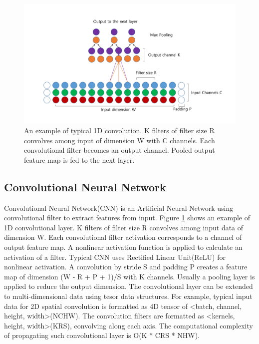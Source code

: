 \begin{figure}
  \centering
  \includegraphics[width=\linewidth]{./figures/convlayer}
  \caption{An example of typical 1D convolution. K filters of filter size R convolves among input of dimension W with C channels.
	Each convolutional filter becomes an output channel. Pooled output feature map is fed to the next layer. }
  \label{fig_convlayer}
\end{figure}

\subsection{Convolutional Neural Network}
Convolutional Neural Network(CNN) is an Artificial Neural Network using convolutional filter to extract features from input.
Figure \ref{fig_convlayer} shows an example of 1D convolutional layer.
K filters of filter size R convolves among input data of dimension W.
Each convolutional filter activation corresponds to a channel of output feature map.
A nonlinear activation function is applied to calculate an activation of a filter.
Typical CNN uses Rectified Linear Unit(ReLU) for nonlinear activation.
A convolution by stride S and padding P creates a feature map of dimension (W - R + P + 1)/S with K channels.
Usually a pooling layer is applied to reduce the output dimension.
The convolutional layer can be extended to multi-dimensional data using tesor data structures.
For example, typical input data for 2D spatial convolution is formatted as 4D tensor of <batch, channel, height, width>(NCHW).
The convolution filters are formatted as <kernels, height, width>(KRS), convolving along each axis.
The computational complexity of propagating such convolutional layer is O(K * CRS * NHW).

